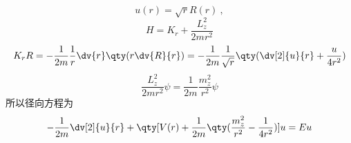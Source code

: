 
\begin{issues}
\issueDraft
\end{issues}


\begin{equation}
u(r) = \sqrt r R(r)~,
\end{equation}
\begin{equation}
H = K_r + \frac{L_z^2}{2m r^2}
\end{equation}
\begin{equation}
K_r R = -\frac{1}{2m} \frac1r \dv{r} \qty(r \dv{R}{r}) =  - \frac{1}{2m} \frac{1}{\sqrt r} \qty(\dv[2]{u}{r} + \frac{u}{4 r^2})
\end{equation}
\begin{equation}
\frac{L_z^2}{2m r^2}\psi  = \frac{1}{2m} \frac{m_z^2}{r^2}\psi 
\end{equation}
所以径向方程为
\begin{equation}
- \frac{1}{2m} \dv[2]{u}{r} + \qty[V(r) + \frac{1}{2m} \qty(\frac{m_z^2}{r^2} - \frac{1}{4 r^2})]u = Eu
\end{equation}
